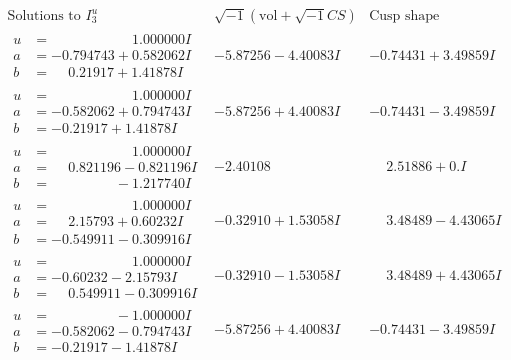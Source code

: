 \documentclass[1p]{elsarticle_modified}
\theoremstyle{definition}
\newcommand{\I}{\sqrt{-1}}
\begin{document}
$$\begin{array}{c|c|c}  
\text{Solutions to }I^u_{3}& \I (\text{vol} + \sqrt{-1}CS) & \text{Cusp shape}\\
 \hline 
\begin{aligned}
u &= \phantom{-0.000000 -}1.000000 I \\
a &= -0.794743 + 0.582062 I \\
b &= \phantom{-}0.21917 + 1.41878 I\end{aligned}
 & -5.87256 - 4.40083 I & -0.74431 + 3.49859 I \\ \hline\begin{aligned}
u &= \phantom{-0.000000 -}1.000000 I \\
a &= -0.582062 + 0.794743 I \\
b &= -0.21917 + 1.41878 I\end{aligned}
 & -5.87256 + 4.40083 I & -0.74431 - 3.49859 I \\ \hline\begin{aligned}
u &= \phantom{-0.000000 -}1.000000 I \\
a &= \phantom{-}0.821196 - 0.821196 I \\
b &= \phantom{-0.000000 } -1.217740 I\end{aligned}
 & -2.40108\phantom{ +0.000000I} & \phantom{-}2.51886 + 0. I\phantom{ +0.000000I} \\ \hline\begin{aligned}
u &= \phantom{-0.000000 -}1.000000 I \\
a &= \phantom{-}2.15793 + 0.60232 I \\
b &= -0.549911 - 0.309916 I\end{aligned}
 & -0.32910 + 1.53058 I & \phantom{-}3.48489 - 4.43065 I \\ \hline\begin{aligned}
u &= \phantom{-0.000000 -}1.000000 I \\
a &= -0.60232 - 2.15793 I \\
b &= \phantom{-}0.549911 - 0.309916 I\end{aligned}
 & -0.32910 - 1.53058 I & \phantom{-}3.48489 + 4.43065 I \\ \hline\begin{aligned}
u &= \phantom{-0.000000 } -1.000000 I \\
a &= -0.582062 - 0.794743 I \\
b &= -0.21917 - 1.41878 I\end{aligned}
 & -5.87256 + 4.40083 I & -0.74431 - 3.49859 I \\ \hline\begin{aligned}

\end{aligned}
\end{array}$$
\end{document}
